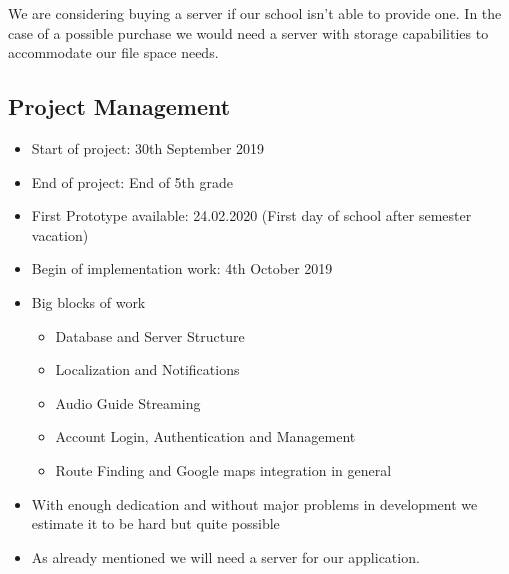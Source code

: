 \documentclass[12pt]{article}
\theoremstyle{definition}
\begin{document}
We are considering buying a server if our school isn't able to provide one. In the case of a possible purchase we would need a server with storage capabilities to accommodate our file space needs.

\subsection{Project Management}
\begin{itemize}
    \item Start of project: 30th September 2019
    \item End of project: End of 5th grade
    \newline
    \item First Prototype available: 24.02.2020 (First day of school after semester vacation)
    \item Begin of implementation work: 4th October 2019
    \newline
    \newline
    \item Big blocks of work
    \begin{itemize}
        \item Database and Server Structure
        \item Localization and Notifications
        \item Audio Guide Streaming
        \item Account Login, Authentication and Management
        \item Route Finding and Google maps integration in general
    \end{itemize}
    \item With enough dedication and without major problems in development we estimate it to be hard but quite possible
    \item As already mentioned we will need a server for our application.
    
\end{itemize} 
\end{document}
